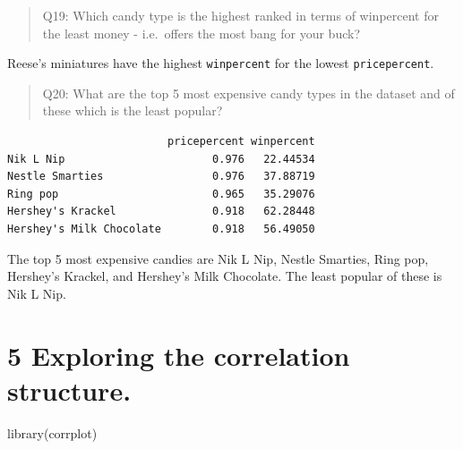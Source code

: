 \documentclass[
  letterpaper,
  DIV=11,
  numbers=noendperiod]{scrartcl}
\newenvironment{Shaded}{\begin{snugshade}}{\end{snugshade}}
\newcommand{\AttributeTok}[1]{\textcolor[rgb]{0.40,0.45,0.13}{#1}}
\newcommand{\ConstantTok}[1]{\textcolor[rgb]{0.56,0.35,0.01}{#1}}
\newcommand{\DecValTok}[1]{\textcolor[rgb]{0.68,0.00,0.00}{#1}}
\newcommand{\FunctionTok}[1]{\textcolor[rgb]{0.28,0.35,0.67}{#1}}
\newcommand{\NormalTok}[1]{\textcolor[rgb]{0.00,0.23,0.31}{#1}}
\newcommand{\OtherTok}[1]{\textcolor[rgb]{0.00,0.23,0.31}{#1}}
\newcommand{\SpecialCharTok}[1]{\textcolor[rgb]{0.37,0.37,0.37}{#1}}
\begin{document}
\begin{quote}
Q19: Which candy type is the highest ranked in terms of winpercent for
the least money - i.e.~offers the most bang for your buck?
\end{quote}

Reese's miniatures have the highest \texttt{winpercent} for the lowest
\texttt{pricepercent}.

\begin{quote}
Q20: What are the top 5 most expensive candy types in the dataset and of
these which is the least popular?
\end{quote}

\begin{Shaded}
\end{Shaded}

\begin{verbatim}
                         pricepercent winpercent
Nik L Nip                       0.976   22.44534
Nestle Smarties                 0.976   37.88719
Ring pop                        0.965   35.29076
Hershey's Krackel               0.918   62.28448
Hershey's Milk Chocolate        0.918   56.49050
\end{verbatim}

The top 5 most expensive candies are Nik L Nip, Nestle Smarties, Ring
pop, Hershey's Krackel, and Hershey's Milk Chocolate. The least popular
of these is Nik L Nip.

\hypertarget{exploring-the-correlation-structure.}{%
\section{5 Exploring the correlation
structure.}\label{exploring-the-correlation-structure.}}

\begin{Shaded}
\begin{Highlighting}[]
\FunctionTok{library}\NormalTok{(corrplot)}
\end{Highlighting}
\end{Shaded}
\end{document}
